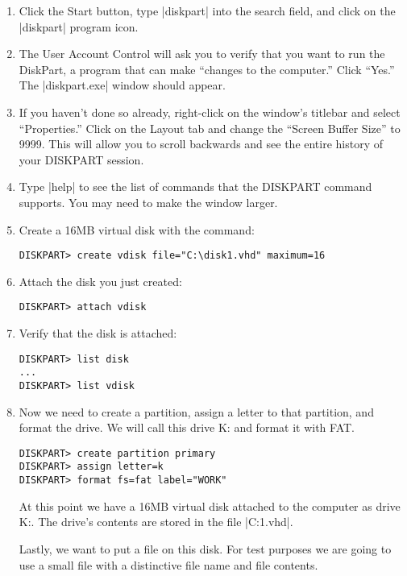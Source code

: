 \begin{enumerate}


\item Click the Start button, type |diskpart| into the search field,
and click on the |diskpart| program icon.
\item The User Account Control will ask you to verify that you want to
run the DiskPart, a program that can make ``changes to the computer.''
Click ``Yes.''  The |diskpart.exe| window should appear.
\item If you haven't done so already, right-click on the window's
titlebar and select ``Properties.'' Click on the Layout tab and change
the ``Screen Buffer Size'' to 9999. This will allow you to scroll
backwards and see the entire history of your DISKPART session.
\item Type |help| to see the list of commands that the DISKPART
command supports. You may need to make the window larger.

\item Create a 16MB virtual disk with the command:

\begin{Verbatim}
DISKPART> create vdisk file="C:\disk1.vhd" maximum=16
\end{Verbatim}

\item Attach the disk you just created:
\begin{Verbatim}
DISKPART> attach vdisk
\end{Verbatim}

\item Verify that the disk is attached:
\begin{Verbatim}
DISKPART> list disk
...
DISKPART> list vdisk
\end{Verbatim}

\item Now we need to create a partition, assign a letter to that
partition, and format the drive. We will call this drive K: and format
it with FAT. 
\begin{Verbatim}
DISKPART> create partition primary
DISKPART> assign letter=k
DISKPART> format fs=fat label="WORK"
\end{Verbatim}

At this point we have a 16MB virtual disk attached to the computer as
drive K:. The drive's contents are stored in the file |C:\disk1.vhd|.

Lastly, we want to put a file on this disk. For test purposes we are
going to use a small file with a distinctive file name and file
contents.


\end{enumerate}
